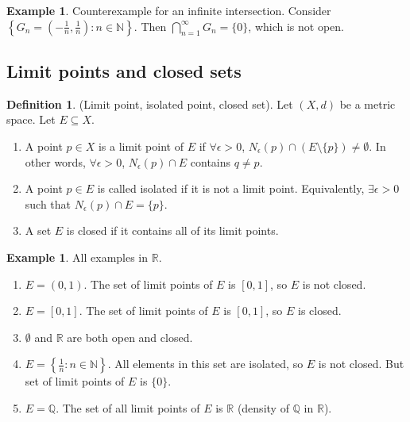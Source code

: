 \documentclass[10pt]{article}
\newcommand{\N}{\mathbb{N}}
\newcommand{\R}{\mathbb{R}}
\newcommand{\Q}{\mathbb{Q}}
\theoremstyle{definition}
\newtheorem{definition}[theorem]{Definition}
\newtheorem{example}[theorem]{Example}
\theoremstyle{remark}
\begin{document}
\begin{example}
    Counterexample for an infinite intersection. Consider $\left\{G_n = \left(-\frac{1}{n}, \frac{1}{n}\right) \colon n \in \N \right\}$. Then $\bigcap_{n=1}^\infty G_n = \{0\}$, which is not open.
\end{example}

\subsection{Limit points and closed sets}

\begin{definition}
    (Limit point, isolated point, closed set).
    Let $(X, d)$ be a metric space. Let $E\subseteq X$.
    \begin{enumerate}
        \item A point $p \in X$ is a limit point of $E$ if $\forall \epsilon > 0$, $N_\epsilon(p) \cap (E \setminus \{p\}) \neq \emptyset$. In other words, $\forall \epsilon > 0$, $N_\epsilon(p) \cap E$ contains $q\neq p$.
        \item A point $p \in E$ is called isolated if it is not a limit point. Equivalently, $\exists \epsilon > 0$ such that $N_\epsilon(p) \cap E = \{p\}$.
        \item A set $E$ is closed if it contains all of its limit points.
    \end{enumerate}
\end{definition}

\begin{example}
    All examples in $\R$.
    \begin{enumerate}
        \item $E = (0, 1)$. The set of limit points of $E$ is $[0, 1]$, so $E$ is not closed.
        \item $E = [0, 1]$. The set of limit points of $E$ is $[0, 1]$, so $E$ is closed.
        \item $\emptyset$ and $\R$ are both open and closed.
        \item $E = \left\{\frac{1}{n} \colon n \in \N\right\}$. All elements in this set are isolated, so $E$ is not closed. But set of limit points of $E$ is $\{0\}$.
        \item $E = \Q$. The set of all limit points of $E$ is $\R$ (density of $\Q$ in $\R$).
    \end{enumerate}
\end{example}
\end{document}
